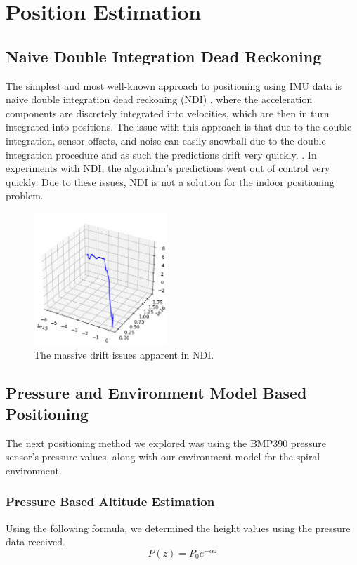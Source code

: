 \section{Position Estimation}
\subsection{Naive Double Integration Dead Reckoning}
The simplest and most well-known approach to positioning using IMU data is naive double integration dead reckoning (NDI) \cite{yan_2019_ronin}, where the acceleration components are discretely integrated into velocities, which are then in turn integrated into positions. The issue with this approach is that due to the double integration, sensor offsets, and noise can easily snowball due to the double integration procedure and as such the predictions drift very quickly. \cite{yan_2019_ronin}. In experiments with NDI, the algorithm's predictions went out of control very quickly. Due to these issues, NDI is not a solution for the indoor positioning problem.

\begin{figure}[h] 
	\centering \includegraphics[height=5cm]{./images/ndi.png}
	\caption{The massive drift issues apparent in NDI.}
\end{figure}

\subsection{Pressure and Environment Model Based Positioning}
The next positioning method we explored was using the BMP390 pressure sensor's pressure values, along with our environment model for the spiral environment.
\subsubsection{Pressure Based Altitude Estimation}
Using the following formula, we determined the height values using the pressure data received.
$$P\left(z\right)=P_0e^{-\alpha z}$$

